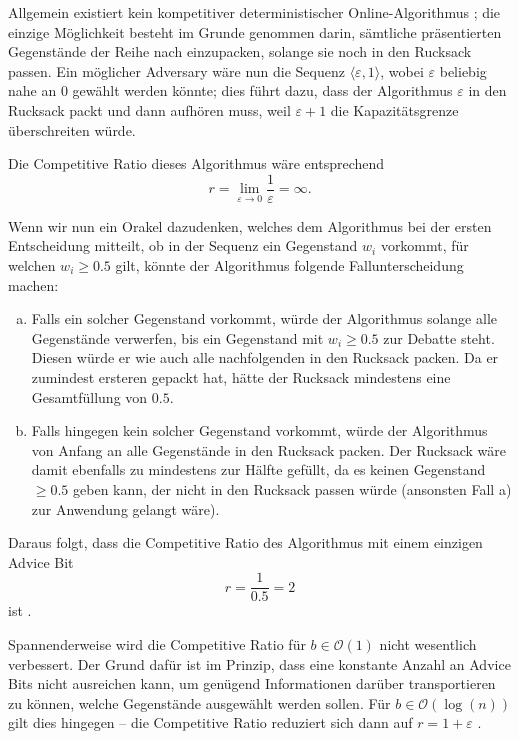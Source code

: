 \documentclass[11pt,abstracton]{scrreprt} %
\theoremstyle{definition}
\begin{document}
\bigskip
Allgemein existiert kein kompetitiver deterministischer Online-Algorithmus \cite{spaccamela}; die einzige Möglichkeit besteht im Grunde genommen darin, sämtliche präsentierten Gegenstände der Reihe nach einzupacken, solange sie noch in den Rucksack passen. Ein möglicher Adversary wäre nun die Sequenz $\langle \varepsilon, 1 \rangle$, wobei $\varepsilon$ beliebig nahe an $0$ gewählt werden könnte; dies führt dazu, dass der Algorithmus $\varepsilon$ in den Rucksack packt und dann aufhören muss, weil $\varepsilon + 1$ die Kapazitätsgrenze überschreiten würde.

Die Competitive Ratio dieses Algorithmus wäre entsprechend
\[
	r = \lim_{\varepsilon \rightarrow 0} \frac {1} { \varepsilon} = \infty.
\]

Wenn wir nun ein Orakel dazudenken, welches dem Algorithmus bei der ersten Entscheidung mitteilt, ob in der Sequenz ein Gegenstand $w_i$ vorkommt, für welchen $w_i \ge 0.5$ gilt, könnte der Algorithmus folgende Fallunterscheidung machen:

\begin{enumerate}[a)]
\item Falls ein solcher Gegenstand vorkommt, würde der Algorithmus solange alle Gegenstände verwerfen, bis ein Gegenstand mit $w_i \ge 0.5$ zur Debatte steht. Diesen würde er wie auch alle nachfolgenden in den Rucksack packen. Da er zumindest ersteren gepackt hat, hätte der Rucksack mindestens eine Gesamtfüllung von $0.5$.
\item Falls hingegen kein solcher Gegenstand vorkommt, würde der Algorithmus von Anfang an alle Gegenstände in den Rucksack packen. Der Rucksack wäre damit ebenfalls zu mindestens zur Hälfte gefüllt, da es keinen Gegenstand $\ge 0.5$ geben kann, der nicht in den Rucksack passen würde (ansonsten Fall a) zur Anwendung gelangt wäre).
\end{enumerate}

Daraus folgt, dass die Competitive Ratio des Algorithmus mit einem einzigen Advice Bit
\[
	r = \frac 1 {0.5} = 2
\]
ist \cite{knapsack}.

\bigskip
Spannenderweise wird die Competitive Ratio für $b \in \mathcal{O}(1)$ nicht wesentlich verbessert. Der Grund dafür ist im Prinzip, dass eine konstante Anzahl an Advice Bits nicht ausreichen kann, um genügend Informationen darüber transportieren zu können, welche Gegenstände ausgewählt werden sollen. Für $b \in \mathcal{O}(\log(n))$ gilt dies hingegen -- die Competitive Ratio reduziert sich dann auf $r = 1 + \varepsilon$ \cite{knapsack}.
\end{document}
